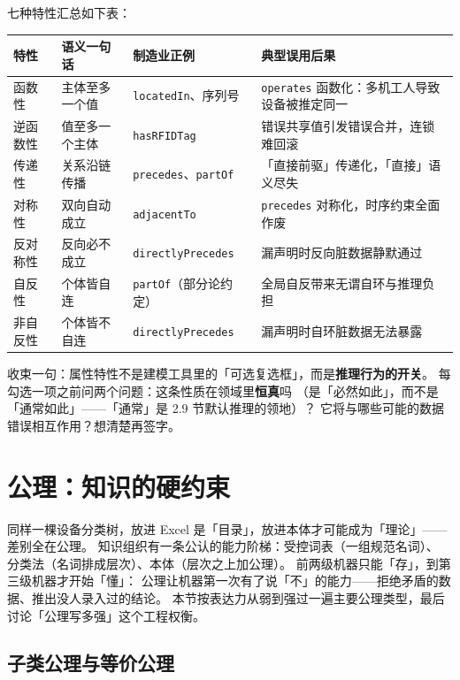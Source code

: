 七种特性汇总如下表：

\begin{center}
\begin{tabularx}{\linewidth}{@{}lXXX@{}}
\toprule
\textbf{特性} & \textbf{语义一句话} & \textbf{制造业正例} & \textbf{典型误用后果} \\
\midrule
函数性 & 主体至多一个值 & \texttt{locatedIn}、序列号 &
\texttt{operates} 函数化：多机工人导致设备被推定同一 \\
逆函数性 & 值至多一个主体 & \texttt{hasRFIDTag} &
错误共享值引发错误合并，连锁难回滚 \\
传递性 & 关系沿链传播 & \texttt{precedes}、\texttt{partOf} &
「直接前驱」传递化，「直接」语义尽失 \\
对称性 & 双向自动成立 & \texttt{adjacentTo} &
\texttt{precedes} 对称化，时序约束全面作废 \\
反对称性 & 反向必不成立 & \texttt{directlyPrecedes} &
漏声明时反向脏数据静默通过 \\
自反性 & 个体皆自连 & \texttt{partOf}（部分论约定） &
全局自反带来无谓自环与推理负担 \\
非自反性 & 个体皆不自连 & \texttt{directlyPrecedes} &
漏声明时自环脏数据无法暴露 \\
\bottomrule
\end{tabularx}
\end{center}

收束一句：属性特性不是建模工具里的「可选复选框」，而是\textbf{推理行为的开关}。
每勾选一项之前问两个问题：这条性质在领域里\textbf{恒真}吗
（是「必然如此」，而不是「通常如此」——「通常」是 2.9 节默认推理的领地）？
它将与哪些可能的数据错误相互作用？想清楚再签字。

\section{公理：知识的硬约束}

同样一棵设备分类树，放进 Excel 是「目录」，放进本体才可能成为「理论」——差别全在公理。
知识组织有一条公认的能力阶梯：受控词表（一组规范名词）、
分类法（名词排成层次）、本体（层次之上加公理）。
前两级机器只能「存」，到第三级机器才开始「懂」：
公理让机器第一次有了说「不」的能力——拒绝矛盾的数据、推出没人录入过的结论。
本节按表达力从弱到强过一遍主要公理类型，最后讨论「公理写多强」这个工程权衡。

\subsection{子类公理与等价公理}

